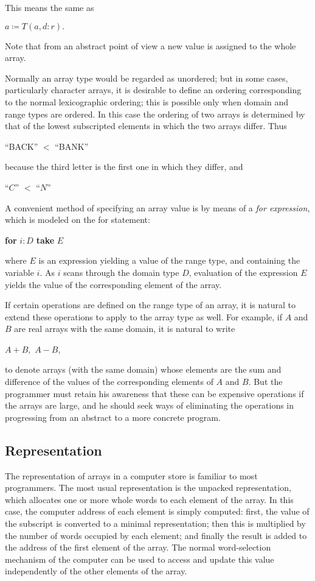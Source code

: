 \noindent
This means the same as

\quad $a\coloneq T(a, d:r).$

\noindent
Note that from an abstract point of view a new value is assigned to the whole array.

Normally an array type would be regarded as unordered; but in some cases, particularly character arrays, it is desirable to define an ordering corresponding to the normal lexicographic ordering; this is possible only when domain and range types are ordered. In this case the ordering of two arrays is determined by that of the lowest subscripted elements in which the two arrays differ. Thus

\quad ``BACK'' $<$ ``BANK''

\noindent
because the third letter is the first one in which they differ, and

\quad ``$C$'' $<$ ``$N$''

A convenient method of specifying an array value is by means of a \textit{for expression}, which is modeled on the for statement:

\quad \textbf{for} $i:D$ \textbf{take} $E$

\noindent
where $E$ is an expression yielding a value of the range type, and containing the variable $i$. As $i$ scans through the domain type $D$, evaluation of the expression $E$ yields the value of the corresponding element of the array.

If certain operations are defined on the range type of an array, it is natural to extend these operations to apply to the array type as well. For example, if $A$ and $B$ are real arrays with the same domain, it is natural to write

\quad $A + B,$ $A - B$,

to denote arrays (with the same domain) whose elements are the sum and difference of the values of the corresponding elements of $A$ and $B$. But the programmer must retain his awareness that these can be expensive operations if the arrays are large, and he should seek ways of eliminating the operations in progressing from an abstract to a more concrete program.

\subsection{Representation}
\label{subsec:representation-6.2}

The representation of arrays in a computer store is familiar to most programmers. The most usual representation is the unpacked representation, which allocates one or more whole words to each element of the array. In this case, the computer address of each element is simply computed: first, the value of the subscript is converted to a minimal representation; then this is multiplied by the number of words occupied by each element; and finally the result is added to the address of the first element of the array. The normal word-selection mechanism of the computer can be used to access and update this value independently of the other elements of the array.

